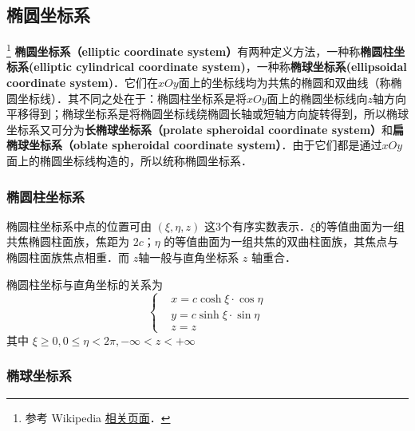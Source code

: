 
\begin{issues}
\issueDraft
\end{issues}


\subsection{椭圆坐标系}
\footnote{参考 Wikipedia \href{https://en.wikipedia.org/wiki/Elliptic_coordinate_system}{相关页面}．}
\textbf{椭圆坐标系（elliptic coordinate system）}有两种定义方法，一种称\textbf{椭圆柱坐标系(elliptic cylindrical coordinate system)}，一种称\textbf{椭球坐标系(ellipsoidal coordinate system)}．它们在$xOy$面上的坐标线均为共焦的椭圆和双曲线（称椭圆坐标线）．其不同之处在于：椭圆柱坐标系是将$xOy$面上的椭圆坐标线向$z$轴方向平移得到；椭球坐标系是将椭圆坐标线绕椭圆长轴或短轴方向旋转得到，所以椭球坐标系又可分为\textbf{长椭球坐标系（prolate spheroidal coordinate system）}和\textbf{扁椭球坐标系（oblate spheroidal coordinate system）}．由于它们都是通过$xOy$面上的椭圆坐标线构造的，所以统称椭圆坐标系．
\subsubsection{椭圆柱坐标系}
椭圆柱坐标系中点的位置可由 $(\xi,\eta,z)$ 这3个有序实数表示．$\xi$的等值曲面为一组共焦椭圆柱面族，焦距为 $2c$；$\eta$ 的等值曲面为一组共焦的双曲柱面族，其焦点与椭圆柱面族焦点相重．而 $z$轴一般与直角坐标系 $z$ 轴重合．

椭圆柱坐标与直角坐标的关系为
\begin{equation}\label{EliCor_eq1}
\left\{\begin{aligned}
&x=c\cosh\xi\cdot\cos\eta\\
&y=c\sinh\xi\cdot\sin\eta\\
&z=z
\end{aligned}\right.
\end{equation}
其中 $\xi\geq0,0\leq\eta<2\pi,-\infty<z<+\infty$
\subsubsection{椭球坐标系}

